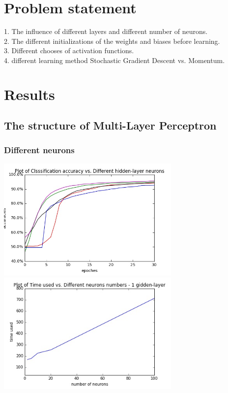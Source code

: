 \documentclass[12pt,a4paper]{article}
\begin{document}
\section{Problem statement}
1. The influence of different layers and different number of neurons.\\
2. The different initializations of the weights and biases before learning.\\
3. Different chooses of activation functions.\\
4. different learning method Stochastic Gradient Descent vs. Momentum.\\
\section{Results}
\subsection{The structure of Multi-Layer Perceptron}
\subsubsection{Different neurons}
\includegraphics[width=90mm,scale=1]{p101.jpg}\\
\includegraphics[width=90mm,scale=1]{p102.jpg}\\
\end{document}
